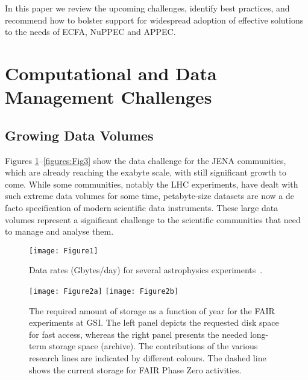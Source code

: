 In this paper we review the upcoming challenges, identify best practices, and recommend how to bolster support for widespread adoption of effective solutions to the needs of ECFA, NuPPEC and APPEC.


\section{Computational and Data Management Challenges}

\subsection{Growing Data Volumes}

Figures \ref{figures:Fig1}--\ref{figures:Fig3} show the data challenge for the JENA communities, which are already reaching the exabyte scale, with still significant growth to come. While some communities, notably the LHC experiments, have dealt with such extreme data volumes for some time, petabyte-size datasets are now a de facto specification of modern scientific data instruments.  These large data volumes represent a significant challenge to the scientific communities that need to manage and analyse them.

\begin{figure}[htbp]
    \begin{center}
        \texttt{[image: Figure1]} \\ 
        \caption{Data rates (Gbytes/day) for several astrophysics experiments~\cite{berghöfer2015modelcomputingeuropeanastroparticle}.}
        \label{figures:Fig1}
    \end{center}
\end{figure}

\begin{figure}[htbp]
    \begin{center}
        \texttt{[image: Figure2a]} 
        \texttt{[image: Figure2b]} \\ 
        \caption{The required amount of storage as a function of year for the FAIR experiments at GSI. The left panel depicts the requested disk space for fast access, whereas the right panel presents the needed long-term storage space (archive). The contributions of the various research lines are indicated by different colours. The dashed line shows the current storage for FAIR Phase Zero activities.} %
        \label{figures:Fig2}
    \end{center}
\end{figure}

